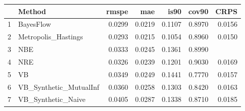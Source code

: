 \documentclass[12pt]{article}
\begin{document}
\thispagestyle{empty}
\begin{table}[ht]
\centering
\begin{tabular}{rlrrrrr}
  \hline
 & Method & rmspe & mae & is90 & cov90 & CRPS \\ 
  \hline
1 & BayesFlow & 0.0299 & 0.0219 & 0.1107 & 0.8970 & 0.0156 \\ 
  2 & Metropolis\_Hastings & 0.0293 & 0.0215 & 0.1054 & 0.8960 & 0.0150 \\ 
  3 & NBE & 0.0333 & 0.0245 & 0.1361 & 0.8990 &  \\ 
  4 & NRE & 0.0326 & 0.0239 & 0.1201 & 0.9030 & 0.0169 \\ 
  5 & VB & 0.0349 & 0.0249 & 0.1441 & 0.7770 & 0.0157 \\ 
  6 & VB\_Synthetic\_MutualInf & 0.0360 & 0.0258 & 0.1303 & 0.8420 & 0.0163 \\ 
  7 & VB\_Synthetic\_Naive & 0.0405 & 0.0287 & 0.1338 & 0.8710 & 0.0185 \\ 
   \hline
\end{tabular}
\end{table}
\end{document}
